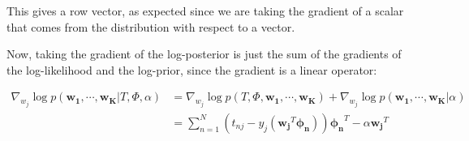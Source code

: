 \documentclass[12pt,a4paper,oneside]{paper}
\begin{document}
This gives a row vector, as expected since we are taking the gradient of a scalar that comes from the distribution with respect to a vector.

Now, taking the gradient of the log-posterior is just the sum of the gradients of the log-likelihood and the log-prior,
since the gradient is a linear operator:

\begin{align*}
    \nabla_{w_j} \log p(\bm{w_1}, \cdots, \bm{w_K} | T, \Phi, \alpha) &= \nabla_{w_j} \log p(T, \Phi, \bm{w_1}, \cdots, \bm{w_K}) + \nabla_{w_j} \log p(\bm{w_1}, \cdots, \bm{w_K} | \alpha) \\
    &= \sum_{n=1}^{N} (t_{nj} - y_j(\bm{w_j}^T \bm{\phi_n})) \bm{\phi_n}^T - \alpha \bm{w_{j}}^T
\end{align*}







\clearpage

\appendix


\newpage
\printbibliography
\end{document}
